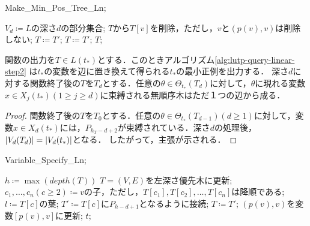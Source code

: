 \begin{algorithm}[tb]
\caption{{\sc Make\_Min\_Pos\_Tree\_Ln};} \label{alg:lutp-query-linear-step2}
\begin{algorithmic}[1]
      \State $V_d\coloneqq L$の深さ$d$の部分集合;
          \State $T$から$T[v]$を削除，ただし，$v$と$(p(v),v)$は削除しない;
              \State $T\coloneqq T'$;
            \EndIf
          \Else
            \State $T\coloneqq T'$;
          \EndIf
        \EndIf
      \EndFor
    \EndFor
    \State \Return $T$;
  \EndFunction
\end{algorithmic}
\end{algorithm}


\begin{lemma}\label{lemma3.2}
  関数の出力を$T\in L(t_{\ast})$とする．このときアルゴリズム\ref{alg:lutp-query-linear-step2} は$t_{\ast}$の変数を辺に置き換えて得られる$t_{\ast}$の最小正例を出力する．
  深さ$d$に対する関数終了後の$T$を$T_d$とする．任意の$\theta\in\Theta_{t_{\ast}}(T_d)$に対して，$\theta$に現れる変数$x\in X_j(t_{\ast})(1\geq j\geq d)$に束縛される無順序木はただ１つの辺から成る．
\end{lemma}


\begin{proof}
  関数終了後の$T$を$T_0$とする．任意の$\theta\in\Theta_{t_{\ast}}(T_{d-1})(d\geq1)$に対して，変数$x\in X_d(t_{\ast})$には，$P_{h_T-d+2}$が束縛されている．深さ$d$の処理後，$\lvert V_d(T_d)\rvert=\lvert V_d(t_{\ast})\rvert$となる．
  したがって，主張が示される．
\end{proof}


\begin{algorithm}[tb]
\caption{{\sc Variable\_Specify\_Ln};} \label{alg:lutp-query-linear-step3}
\begin{algorithmic}[1]
    \State $h\coloneqq \max(depth(T))$
    \State $T=(V,E)$を左深さ優先木に更新;
      \State $c_1,\ldots,c_n(c\geq 2)\coloneqq v$の子，ただし，$T[c_1],T[c_2],\ldots,T[c_n]$は降順である;
          \State $l\coloneqq T[c]$の葉;
          \State $T'\coloneqq T[c]$に$P_{h-d+1}$となるように接続;
            \State $T\coloneqq T'$;
            \State $(p(v),v)$を変数$[p(v),v]$に更新;
          \EndIf
        \EndIf
      \EndFor
    \EndFor
    \State \Return $t$;
  \EndFunction
\end{algorithmic}
\end{algorithm}


